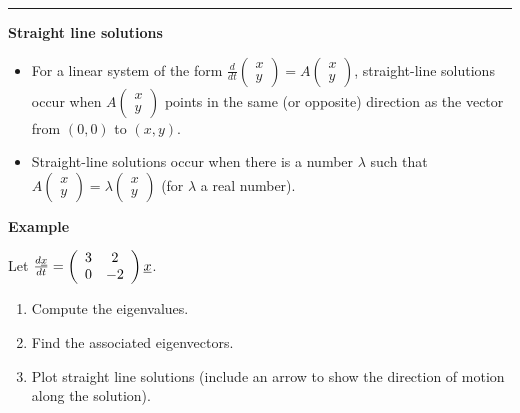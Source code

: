 \documentclass[12pt,letterpaper,noanswers]{exam}
\begin{document}
\vspace{0.2cm}
\hrule
\vspace{0.2cm}

\noindent\textbf{Straight line solutions}
\begin{tcolorbox}
\begin{itemize}
    \item For a linear system of the form $\frac{d}{dt}\left(\begin{array}{c} x \\ y \end{array}\right) = A\left(\begin{array}{c} x \\ y \end{array}\right)$, straight-line solutions occur when $A\left(\begin{array}{c} x \\ y \end{array}\right)$ points in the same (or opposite) direction as the vector from $(0,0)$ to $(x,y)$.
\item Straight-line solutions occur when there is a number $\lambda$ such that $A\left(\begin{array}{c} x \\ y \end{array}\right) = \lambda \left(\begin{array}{c} x \\ y \end{array}\right)$ (for $\lambda$ a real number).
\end{itemize}
\end{tcolorbox}

\noindent\textbf{Example}

Let $\frac{d\underline{x}}{dt} = \left(\begin{array}{c c}3 & 2 \\ 0 & -2\end{array}\right)\underline{x}$.
\begin{enumerate}
    \item Compute the eigenvalues.
    \vspace{1in}
    \item Find the associated eigenvectors.
    \vspace{1in}
    \item Plot straight line solutions (include an arrow to show the direction of motion along the solution).
    \vspace{2in}
\end{enumerate}
\end{document}
